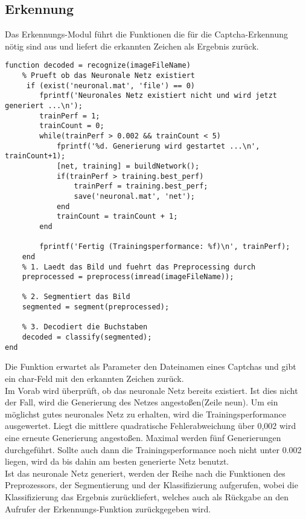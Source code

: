 \subsection{Erkennung}
Das Erkennungs-Modul führt die Funktionen die für die Captcha-Erkennung nötig sind aus und liefert die erkannten Zeichen als Ergebnis zurück.
\begin{lstlisting}
function decoded = recognize(imageFileName)
    % Prueft ob das Neuronale Netz existiert
     if (exist('neuronal.mat', 'file') == 0)
        fprintf('Neuronales Netz existiert nicht und wird jetzt generiert ...\n');
        trainPerf = 1;
        trainCount = 0;
        while(trainPerf > 0.002 && trainCount < 5)
            fprintf('%d. Generierung wird gestartet ...\n', trainCount+1);
            [net, training] = buildNetwork();
            if(trainPerf > training.best_perf)
                trainPerf = training.best_perf;
                save('neuronal.mat', 'net');
            end
            trainCount = trainCount + 1;
        end
    
        fprintf('Fertig (Trainingsperformance: %f)\n', trainPerf);
    end
    % 1. Laedt das Bild und fuehrt das Preprocessing durch
    preprocessed = preprocess(imread(imageFileName));
    
    % 2. Segmentiert das Bild
    segmented = segment(preprocessed);
    
    % 3. Decodiert die Buchstaben
    decoded = classify(segmented);
end
\end{lstlisting}
Die Funktion erwartet als Parameter den Dateinamen eines Captchas und gibt ein char-Feld mit den erkannten Zeichen zurück.\\
Im Vorab wird überprüft, ob das neuronale Netz bereits existiert. Ist dies nicht der Fall, wird die Generierung des Netzes angestoßen(Zeile neun). Um ein möglichst gutes neuronales Netz zu erhalten, wird die Trainingsperformance ausgewertet. Liegt die mittlere quadratische Fehlerabweichung über 0,002 wird eine erneute Generierung angestoßen. Maximal werden fünf Generierungen durchgeführt. Sollte auch dann die Trainingsperformance noch nicht unter 0.002 liegen, wird da bis dahin am besten generierte Netz benutzt.\\
Ist das neuronale Netz generiert, werden der Reihe nach die Funktionen des Preprozessors, der Segmentierung und der Klassifizierung aufgerufen, wobei die Klassifizierung das Ergebnis zurückliefert, welches auch als Rückgabe an den Aufrufer der Erkennungs-Funktion zurückgegeben wird.
\newpage
